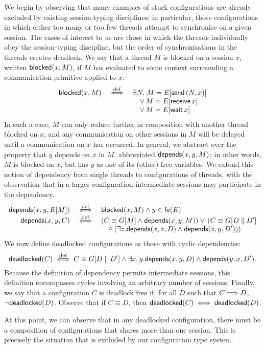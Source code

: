 \documentclass[oribibl,orivec,envcountsame]{llncs}
\begin{document}
We begin by observing that many examples of stuck configurations are already excluded by existing
session-typing disciplines: in particular, those configurations in which either too many or too few
threads attempt to synchronise on a given session.  The cases of interest to us are those in which
the threads individually obey the session-typing discipline, but the order of synchronisations in
the threads creates deadlock.  We say that a thread $M$ is blocked on a session $x$, written
$\mathsf{blocked}(x,M)$, if $M$ has evaluated to some context surrounding a communication primitive applied
to $x$:
%
\[\begin{array}{rcl}
  \mathsf{blocked}(x,M) &\stackrel{\mathrm{def}}{\iff}& \exists N. \; M = E[\mathsf{send} \, (N,x)] \\
  && \quad \lor \, M = E[\mathsf{receive} \, x] \\
  && \quad \lor \, M = E[\mathsf{wait} \, x]
\end{array}\]
%
In such a case, $M$ can only reduce further in composition with another thread blocked on $x$, and
any communication on other sessions in $M$ will be delayed until a communication on $x$ has
occurred. In general, we abstract over the property that $y$ depends on $x$ in $M$, abbreviated
$\mathsf{depends}(x,y,M)$; in other words, $M$ is blocked on $x$, but has $y$ as one of its (other) free
variables. We extend this notion of dependency from single threads to configurations of threads,
with the observation that in a larger configuration intermediate sessions may participate in the
dependency.
\[\begin{array}{rcl}
  \mathsf{depends}(x,y,E[M]) &\stackrel{\mathrm{def}}{\iff}& \mathsf{blocked}(x,M) \land y \in \mathsf{fv}(E) \\
  \mathsf{depends}(x,y,C) &\stackrel{\mathrm{def}}{\iff}& (C \equiv G[M] \land \mathsf{depends}(x,y,M)) \lor \, (C \equiv G[D \parallel D'] \\
  && \quad \land \, (\exists z. \mathsf{depends}(x,z,D) \land \mathsf{depends}(z,y,D')))
\end{array}\]
%
We now define deadlocked configurations as those with cyclic dependencies:
%
\[
\mathsf{deadlocked}(C) \stackrel{\mathrm{def}}{\iff} C \equiv G[D \parallel D'] \land \exists x,y. \mathsf{depends}(x,y,D) \land \mathsf{depends}(y,x,D').
\]
%
Because the definition of dependency permits intermediate sessions, this definition encompasses
cycles involving an arbitrary number of sessions.  Finally, we say that a configuration $C$ is
deadlock free if, for all $D$ such that $C \Longrightarrow D$, $\lnot\mathsf{deadlocked}(D)$.  Observe that if
$C \equiv D$, then $\mathsf{deadlocked}(C) \iff \mathsf{deadlocked}(D)$.

At this point, we can observe that in any deadlocked configuration, there must be a composition of
configurations that shares more than one session.  This is precisely the situation that is excluded
by our configuration type system.
\end{document}
